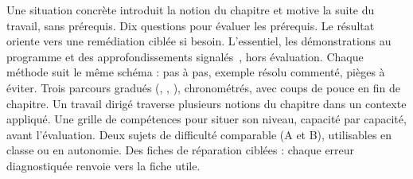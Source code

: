 \documentclass{gabarits/nexus-manuel-v5}
\begin{document}
\begin{modeEmploiNexus}
\rangeeTemps
  {
    {Une situation concrète introduit la notion du chapitre et motive la
     suite du travail, sans prérequis.}}
  {
    {Dix questions pour évaluer les prérequis. Le résultat oriente vers une
     remédiation ciblée si besoin.}}
  {
    {L'essentiel, les démonstrations au programme et des approfondissements
     signalés~\icnEtoile[chapcolor], hors évaluation.}}
\rangeeTemps
  {
    {Chaque méthode suit le même schéma : pas à pas, exemple résolu commenté,
     pièges à éviter.}}
  {
    {Trois parcours gradués (\parcoursUn{}, \parcoursDeux{}, \parcoursTrois{}),
     chronométrés, avec coups de pouce en fin de chapitre.}}
  {
    {Un travail dirigé traverse plusieurs notions du chapitre dans un
     contexte appliqué.}}
\rangeeTemps
  {
    {Une grille de compétences pour situer son niveau, capacité par capacité,
     avant l'évaluation.}}
  {
    {Deux sujets de difficulté comparable (A et B), utilisables en classe ou
     en autonomie.}}
  {
    {Des fiches de réparation ciblées : chaque erreur diagnostiquée renvoie
     vers la fiche utile.}}
\bandeauPictos
\end{modeEmploiNexus}

\sommaireNexus

\end{document}
